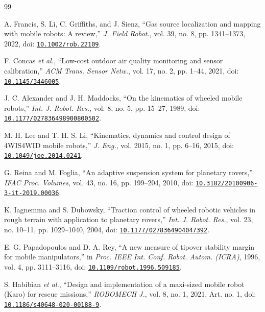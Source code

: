 \documentclass[11pt,a4paper]{article}
\begin{document}
\begin{thebibliography}{99}

A. Francis, S. Li, C. Griffiths, and J. Sienz, “Gas source localization and mapping with mobile robots: A review,” \textit{J. Field Robot.}, vol. 39, no. 8, pp. 1341--1373, 2022, doi: \href{https://doi.org/10.1002/rob.22109}{\nolinkurl{10.1002/rob.22109}}.

F. Concas \textit{et al.}, “Low-cost outdoor air quality monitoring and sensor calibration,” \textit{ACM Trans. Sensor Netw.}, vol. 17, no. 2, pp. 1--44, 2021, doi: \href{https://doi.org/10.1145/3446005}{\nolinkurl{10.1145/3446005}}.

J. C. Alexander and J. H. Maddocks, “On the kinematics of wheeled mobile robots,” \textit{Int. J. Robot. Res.}, vol. 8, no. 5, pp. 15--27, 1989, doi: \href{https://doi.org/10.1177/027836498900800502}{\nolinkurl{10.1177/027836498900800502}}.

M. H. Lee and T. H. S. Li, “Kinematics, dynamics and control design of 4WIS4WID mobile robots,” \textit{J. Eng.}, vol. 2015, no. 1, pp. 6--16, 2015, doi: \href{https://doi.org/10.1049/joe.2014.0241}{\nolinkurl{10.1049/joe.2014.0241}}.

G. Reina and M. Foglia, “An adaptive suspension system for planetary rovers,” \textit{IFAC Proc. Volumes}, vol. 43, no. 16, pp. 199--204, 2010, doi: \href{https://doi.org/10.3182/20100906-3-it-2019.00036}{\nolinkurl{10.3182/20100906-3-it-2019.00036}}.

K. Iagnemma and S. Dubowsky, “Traction control of wheeled robotic vehicles in rough terrain with application to planetary rovers,” \textit{Int. J. Robot. Res.}, vol. 23, no. 10--11, pp. 1029--1040, 2004, doi: \href{https://doi.org/10.1177/0278364904047392}{\nolinkurl{10.1177/0278364904047392}}.

E. G. Papadopoulos and D. A. Rey, “A new measure of tipover stability margin for mobile manipulators,” in \textit{Proc. IEEE Int. Conf. Robot. Autom. (ICRA)}, 1996, vol. 4, pp. 3111--3116, doi: \href{https://doi.org/10.1109/robot.1996.509185}{\nolinkurl{10.1109/robot.1996.509185}}.

S. Habibian \textit{et al.}, “Design and implementation of a maxi-sized mobile robot (Karo) for rescue missions,” \textit{ROBOMECH J.}, vol. 8, no. 1, 2021, Art. no. 1, doi: \href{https://doi.org/10.1186/s40648-020-00188-9}{\nolinkurl{10.1186/s40648-020-00188-9}}.


\end{thebibliography}
\end{document}
